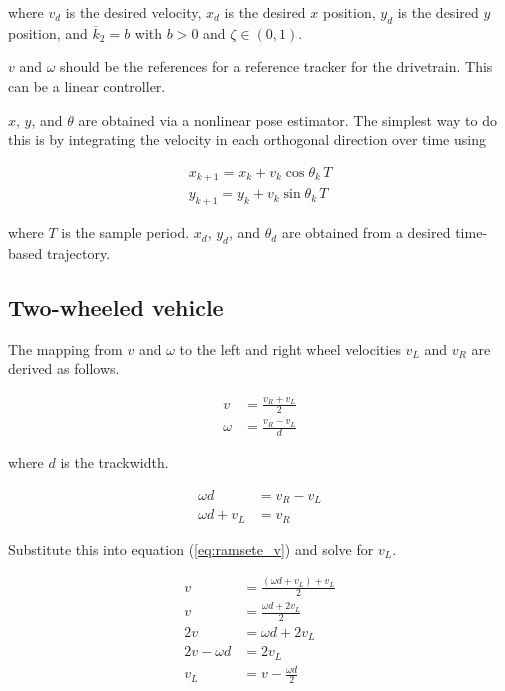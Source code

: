 where $v_d$ is the desired velocity, $x_d$ is the desired $x$ position, $y_d$ is
the desired $y$ position, and $\overline{k}_2 = b$ with $b > 0$ and
$\zeta \in (0, 1)$.

$v$ and $\omega$ should be the \glspl{reference} for a \gls{reference} tracker
for the drivetrain. This can be a linear controller.

$x$, $y$, and $\theta$ are obtained via a nonlinear \gls{pose} estimator. The
simplest way to do this is by integrating the velocity in each orthogonal
direction over time using

\begin{align*}
  x_{k+1} = x_k + v_k\cos\theta_k\,T \\
  y_{k+1} = y_k + v_k\sin\theta_k\,T
\end{align*}

where $T$ is the sample period. $x_d$, $y_d$, and $\theta_d$ are obtained from a
desired time-based trajectory.

\subsection{Two-wheeled vehicle}

The mapping from $v$ and $\omega$ to the left and right wheel velocities $v_L$
and $v_R$ are derived as follows.

\begin{align}
  v &= \frac{v_R + v_L}{2} \label{eq:ramsete_v} \\
  \omega &= \frac{v_R - v_L}{d} \label{eq:ramsete_w}
\end{align}

where $d$ is the trackwidth.

\begin{align*}
  \omega d &= v_R - v_L \\
  \omega d + v_L &= v_R
\end{align*}

Substitute this into equation (\ref{eq:ramsete_v}) and solve for $v_L$.

\begin{align}
  v &= \frac{(\omega d + v_L) + v_L}{2} \nonumber \\
  v &= \frac{\omega d + 2v_L}{2} \nonumber \\
  2v &= \omega d + 2v_L \nonumber \\
  2v - \omega d &= 2v_L \nonumber \\
  v_L &= v - \frac{\omega d}{2}
\end{align}

